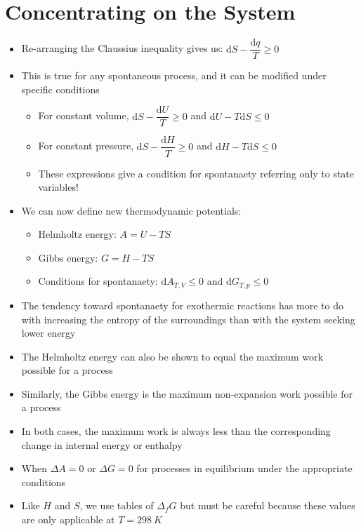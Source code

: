 \documentclass[12pt, openany, letterpaper]{memoir}
\begin{document}
\section{Concentrating on the System}
\begin{itemize}
	\item Re-arranging the Claussius inequality gives us: $\mathrm{d}S - \dfrac{\mathrm{d} q}{T} \geq 0$
	\item This is true for any spontaneous process, and it can be modified under specific conditions
	      \begin{itemize}
		      \item For constant volume, $\mathrm{d}S - \dfrac{\mathrm{d}U}{T}\geq0$ and $\mathrm{d}U-T\mathrm{d}S\leq0$
		      \item For constant pressure, $\mathrm{d}S - \dfrac{\mathrm{d}H}{T}\geq0$ and $\mathrm{d}H - T\mathrm{d}S \leq 0$
		      \item These expressions give a condition for spontanaety referring only to state variables!
	      \end{itemize}
	\item We can now define new thermodynamic potentials:
	      \begin{itemize}
		      \item Helmholtz energy: $A = U - TS$
		      \item Gibbs energy: $G = H-TS$
		      \item Conditions for spontanaety: $\mathrm{d}A_{T,V}\leq0$ and $\mathrm{d}G_{T,p}\leq0$
	      \end{itemize}
	\item The tendency toward spontanaety for exothermic reactions has more to do with increasing the entropy of the surroundings than with the system seeking lower energy
	\item The Helmholtz energy can also be shown to equal the maximum work possible for a process
	\item Similarly, the Gibbs energy is the maximum non-expansion work possible for a process
	\item In both cases, the maximum work is always less than the corresponding change in internal energy or enthalpy
	\item When $\Delta A=0$ or $\Delta G=0$ for processes in equilibrium under the appropriate conditions
	\item Like $H$ and $S$, we use tables of $\Delta_f G$ but must be careful because these values are only applicable at $T=298~K$
\end{itemize}
\end{document}
